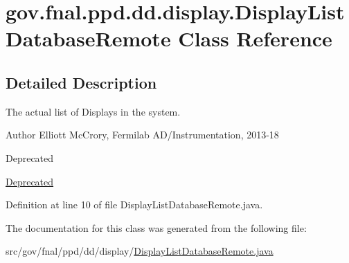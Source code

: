\hypertarget{classgov_1_1fnal_1_1ppd_1_1dd_1_1display_1_1DisplayListDatabaseRemote}{\section{gov.\-fnal.\-ppd.\-dd.\-display.\-Display\-List\-Database\-Remote Class Reference}
\label{classgov_1_1fnal_1_1ppd_1_1dd_1_1display_1_1DisplayListDatabaseRemote}
}


\subsection{Detailed Description}
The actual list of Displays in the system.

\begin{DoxyAuthor}{Author}
Elliott Mc\-Crory, Fermilab A\-D/\-Instrumentation, 2013-\/18 
\end{DoxyAuthor}
\begin{DoxyRefDesc}{Deprecated}
\item[\hyperlink{deprecated__deprecated000007}{Deprecated}]\end{DoxyRefDesc}


Definition at line 10 of file Display\-List\-Database\-Remote.\-java.



The documentation for this class was generated from the following file\-:\begin{DoxyCompactItemize}
\item 
src/gov/fnal/ppd/dd/display/\hyperlink{DisplayListDatabaseRemote_8java}{Display\-List\-Database\-Remote.\-java}\end{DoxyCompactItemize}
